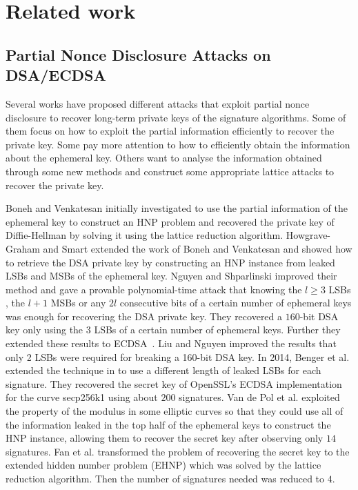 \section{Related work}
\label{sec:relatedwork}
\subsection{Partial Nonce Disclosure Attacks on DSA/ECDSA}
Several works have proposed different attacks that exploit partial nonce disclosure to recover long-term private keys of the signature algorithms.
Some of them focus on how to exploit the partial information efficiently to recover the private key.
 Some pay more attention to how to efficiently obtain the information about the ephemeral key.
Others want to  analyse the information obtained through some new methods and construct some appropriate lattice attacks to recover the private key.

Boneh and Venkatesan \cite{boneh1996} initially investigated to use the partial information of the ephemeral key to construct an HNP problem and recovered the private key of Diffie-Hellman by solving it using the lattice reduction algorithm.
Howgrave-Graham and Smart \cite{HG2001} extended the work of Boneh and Venkatesan \cite{boneh1996} and  showed how to retrieve the DSA private key by  constructing an HNP instance from leaked LSBs and MSBs of the ephemeral key.
Nguyen and Shparlinski \cite{Nguyen2002} improved their method  and gave a provable polynomial-time attack that
      knowing the $l \geq 3$ LSBs , the $l+1$ MSBs  or any $2l$ consecutive bits of a certain number of ephemeral keys was enough for recovering the DSA private key.
 They recovered  a $160$-bit DSA key only using the $3$ LSBs of a certain number of ephemeral keys.
 Further they extended these results to ECDSA~\cite{Nguyen2003}.
Liu and Nguyen \cite{Liu2013} improved the results that only 2 LSBs were required for breaking a 160-bit DSA key.
In 2014, Benger et al. \cite{Benger2014} extended the technique in \cite{Nguyen2002} to use a different length of leaked LSBs for each signature.
 They recovered the secret key of OpenSSL's ECDSA implementation for the curve secp256k1 using about $200$ signatures.
Van de Pol et al. \cite{Van2015} exploited the property of the modulus in some elliptic curves so that they could use all of the information leaked in the top half of the ephemeral keys to construct the HNP instance, allowing them to recover the secret key after observing only $14$ signatures.
Fan et al. \cite{Fan2016} transformed the problem of recovering the secret key to the extended hidden number problem (EHNP)
  which was solved by the lattice reduction algorithm.
   Then the number of signatures needed was reduced to $4$.
   
